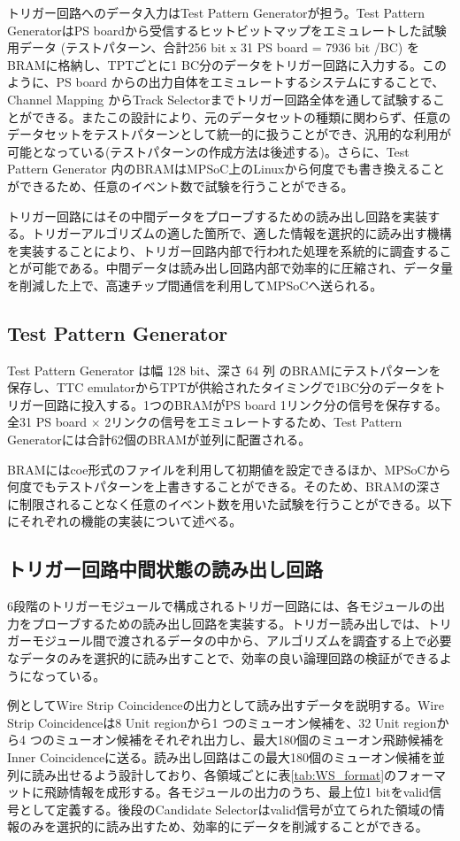 トリガー回路へのデータ入力はTest Pattern Generatorが担う。Test Pattern GeneratorはPS boardから受信するヒットビットマップをエミュレートした試験用データ (テストパターン、合計256 bit x 31 PS board = 7936 bit /BC) をBRAMに格納し、TPTごとに1 BC分のデータをトリガー回路に入力する。このように、PS board からの出力自体をエミュレートするシステムにすることで、Channel Mapping からTrack Selectorまでトリガー回路全体を通して試験することができる。またこの設計により、元のデータセットの種類に関わらず、任意のデータセットをテストパターンとして統一的に扱うことができ、汎用的な利用が可能となっている(テストパターンの作成方法は後述する)。さらに、Test Pattern Generator 内のBRAMはMPSoC上のLinuxから何度でも書き換えることができるため、任意のイベント数で試験を行うことができる。

トリガー回路にはその中間データをプローブするための読み出し回路を実装する。トリガーアルゴリズムの適した箇所で、適した情報を選択的に読み出す機構を実装することにより、トリガー回路内部で行われた処理を系統的に調査することが可能である。中間データは読み出し回路内部で効率的に圧縮され、データ量を削減した上で、高速チップ間通信を利用してMPSoCへ送られる。

\subsection*{Test Pattern Generator}
Test Pattern Generator は幅 128 bit、深さ 64 列 のBRAMにテストパターンを保存し、TTC emulatorからTPTが供給されたタイミングで1BC分のデータをトリガー回路に投入する。1つのBRAMがPS board 1リンク分の信号を保存する。全31 PS board $\times$ 2リンクの信号をエミュレートするため、Test Pattern Generatorには合計62個のBRAMが並列に配置される。

BRAMにはcoe形式のファイルを利用して初期値を設定できるほか、MPSoCから何度でもテストパターンを上書きすることができる。そのため、BRAMの深さに制限されることなく任意のイベント数を用いた試験を行うことができる。以下にそれぞれの機能の実装について述べる。


\subsection*{トリガー回路中間状態の読み出し回路}
6段階のトリガーモジュールで構成されるトリガー回路には、各モジュールの出力をプローブするための読み出し回路を実装する。トリガー読み出しでは、トリガーモジュール間で渡されるデータの中から、アルゴリズムを調査する上で必要なデータのみを選択的に読み出すことで、効率の良い論理回路の検証ができるようになっている。

例としてWire Strip Coincidenceの出力として読み出すデータを説明する。Wire Strip Coincidenceは8 Unit regionから1 つのミューオン候補を、32 Unit regionから4 つのミューオン候補をそれぞれ出力し、最大180個のミューオン飛跡候補をInner Coincidenceに送る。読み出し回路はこの最大180個のミューオン候補を並列に読み出せるよう設計しており、各領域ごとに表\ref{tab:WS_format}のフォーマットに飛跡情報を成形する。各モジュールの出力のうち、最上位1 bitをvalid信号として定義する。後段のCandidate Selectorはvalid信号が立てられた領域の情報のみを選択的に読み出すため、効率的にデータを削減することができる。

